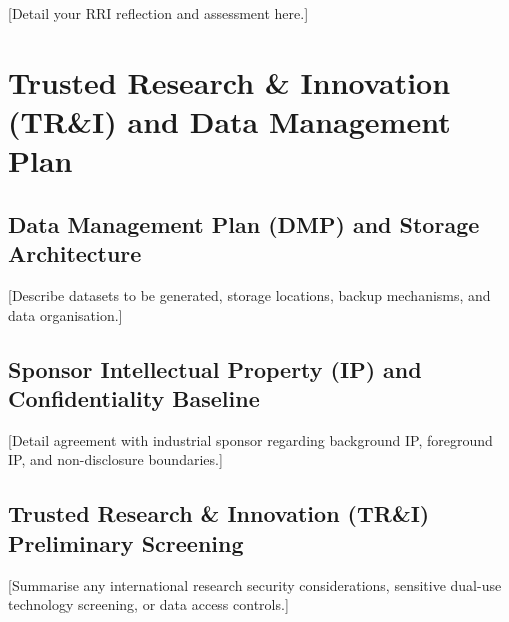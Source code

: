 \documentclass[year1]{../idcore-ar}
\begin{document}
[Detail your RRI reflection and assessment here.]


\section{Trusted Research \& Innovation (TR\&I) and Data Management Plan}

\subsection{Data Management Plan (DMP) and Storage Architecture}
[Describe datasets to be generated, storage locations, backup mechanisms, and data organisation.]

\subsection{Sponsor Intellectual Property (IP) and Confidentiality Baseline}
[Detail agreement with industrial sponsor regarding background IP, foreground IP, and non-disclosure boundaries.]

\subsection{Trusted Research \& Innovation (TR\&I) Preliminary Screening}
[Summarise any international research security considerations, sensitive dual-use technology screening, or data access controls.]
\end{document}
